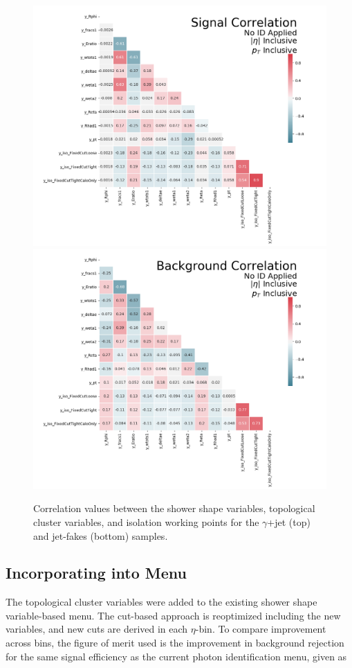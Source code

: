 \begin{figure}[!hp]
    \centering
    \includegraphics[width=.77\textwidth]{chapters/chapter4_photonID/images/sig_none_corr.png}
    \includegraphics[width=.77\textwidth]{chapters/chapter4_photonID/images/bkg_none_corr.png}
    \caption[Correlation values between the shower shape variables, topological cluster variables, and isolation working points for the $\gamma$+jet and jet-fakes sample] {Correlation values between the shower shape variables, topological cluster variables, and isolation working points for the $\gamma$+jet (top) and jet-fakes (bottom) samples.}
    \label{fig:photonid-corrs}
\end{figure}

\subsection{Incorporating into Menu}

The topological cluster variables were added to the existing shower shape variable-based menu. The cut-based approach is reoptimized including the new variables, and new cuts are derived in each $\eta$-\pt bin. To compare improvement across bins, the figure of merit used is the improvement in background rejection for the same signal efficiency as the current photon identification menu, given as

